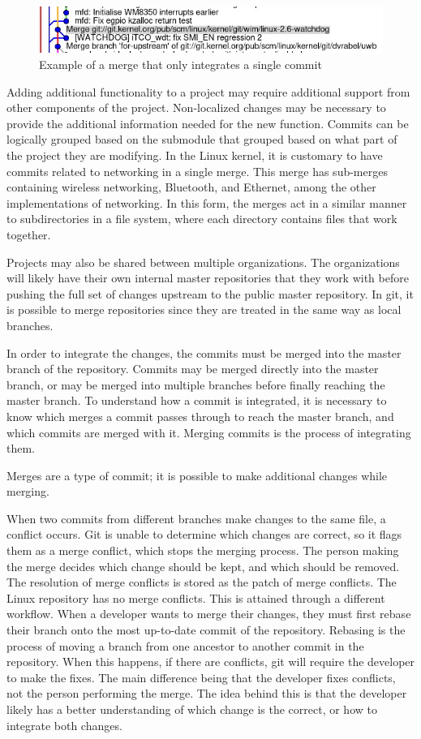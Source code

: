 \begin{figure}[htpb]
  \centering
  \includegraphics[width=0.8\linewidth]{Figures/background/single_commit.png}
  \caption{Example of a merge that only integrates a single commit}
  \label{fig:single_commit_merge}
\end{figure}


Adding additional functionality to a project may require additional
support from other components of the project.
Non-localized changes may be necessary to provide the additional
information needed for the new function.
Commits can be logically grouped based on the submodule that grouped
based on what part of the project they are modifying.
In the Linux kernel, it is customary to have commits related to
networking in a single merge.
This merge has sub-merges containing wireless networking, Bluetooth,
and Ethernet, among the other implementations of networking.
In this form, the merges act in a similar manner to subdirectories in a
file system, where each directory contains files that work together.

Projects may also be shared between multiple organizations.
The organizations will likely have their own internal master
repositories that they work with before pushing the full set of
changes upstream to the public master repository.
In git, it is possible to merge repositories since they are treated in
the same way as local branches.

In order to integrate the changes, the commits must be merged into the
master branch of the repository.
Commits may be merged directly into the master branch, or may be merged
into multiple branches before finally reaching the master branch.
To understand how a commit is integrated, it is necessary to know which
merges a commit passes through to reach the master branch, and which
commits are merged with it.
Merging commits is the process of integrating them.

Merges are a type of commit; it is possible to make additional
changes while merging.

When two commits from different branches make changes to the same file,
a conflict occurs.
Git is unable to determine which changes are correct, so it flags them
as a merge conflict, which stops the merging process.
The person making the merge decides which change should be kept,
and which should be removed.
The resolution of merge conflicts is stored as the patch of merge
conflicts.
The Linux repository has no merge conflicts.
This is attained through a different workflow.
When a developer wants to merge their changes, they must first rebase
their branch onto the most up-to-date commit of the repository.
Rebasing is the process of moving a branch from one ancestor to another
commit in the repository.
When this happens, if there are conflicts, git will require
the developer to make the fixes.
The main difference being that the developer fixes conflicts,
not the person performing the merge.
The idea behind this is that the developer likely has a better
understanding of which change is the correct, or how to integrate both
changes.

